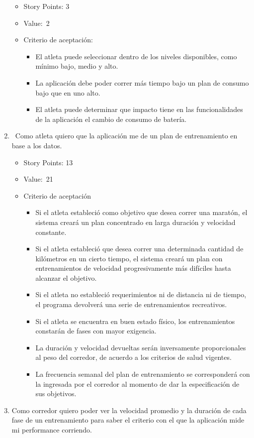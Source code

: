 \begin{enumerate}
  \begin{itemize}
  \item
    Story Points: 3
  \item
    Value:~2
  \item
    Criterio de aceptación:

    \begin{itemize}
    \itemsep1pt\parskip0pt
    \item
      El atleta puede seleccionar dentro de los niveles disponibles,
      como mínimo bajo, medio y alto.
    \item
      La aplicación debe poder correr más tiempo bajo un plan de consumo
      bajo que en uno alto.
    \item
      El atleta puede determinar que impacto tiene en las
      funcionalidades de la aplicación el cambio de consumo de batería.
    \end{itemize}
  \end{itemize}
\item
  ~Como atleta quiero que la aplicación me de un plan de entrenamiento
  en base a los datos.

  \begin{itemize}
  \item
    Story Points: 13
  \item
    Value:~21
  \item
    Criterio de aceptación

    \begin{itemize}
    \item
      Si el atleta estableció como objetivo que desea correr una
      maratón, el sistema creará un plan concentrado en larga duración y
      velocidad constante.
    \item
      Si el atleta estableció que desea correr una determinada cantidad
      de kilómetros en un cierto tiempo, el sistema creará un plan con
      entrenamientos de velocidad progresivamente más difíciles hasta
      alcanzar el objetivo.
    \item
      Si el atleta no estableció requerimientos ni de distancia ni de
      tiempo, el programa devolverá una serie de entrenamientos
      recreativos.
    \item
      Si el atleta se encuentra en buen estado físico, los
      entrenamientos constarán de fases con mayor exigencia.
    \item
      La duración y velocidad devueltas serán inversamente
      proporcionales al peso del corredor, de acuerdo a los criterios de
      salud vigentes.
    \item
      La frecuencia semanal del plan de entrenamiento se corresponderá
      con la ingresada por el corredor al momento de dar la
      especificación de sus objetivos.
    \end{itemize}
  \end{itemize}
\item
  Como corredor quiero poder ver la velocidad promedio y la duración de
  cada fase de un entrenamiento para saber el criterio con el que la
  aplicación mide mi performance corriendo.


\end{enumerate}
